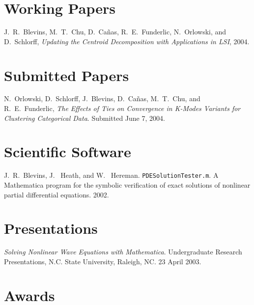 \documentclass[overlapped,line,final,11pt,letterpaper]{res}
\begin{document}
\begin{resume}

\section{\bf Working Papers}

J.\ R.\ Blevins, M.\ T.\ Chu, D.\ Ca\~{n}as, R.\ E.\ Funderlic, N.\
Orlowski, and D.\ Schlorff, {\em Updating the Centroid Decomposition
  with Applications in LSI}, 2004.


\newpage

\section{\bf Submitted Papers}

N.\ Orlowski, D.\ Schlorff, J.\ Blevins, D.\ Ca\~{n}as, M.\ T.\
Chu, and R.\ E.\ Funderlic, {\em The Effects of Ties on Convergence in
  K-Modes Variants for Clustering Categorical Data}. Submitted June 7,
2004.


\section{\bf Scientific Software}

J.\ R.\ Blevins, J. \ Heath, and W. \
Hereman. \texttt{PDESolutionTester.m}.  A Mathematica program for the
symbolic verification of exact solutions of nonlinear partial
differential equations. 2002.


\section{\bf Presentations}

{\em Solving Nonlinear Wave Equations with Mathematica}. Undergraduate
Research Presentations, N.C. State University, Raleigh,
NC. 23 April 2003.



\section{\bf Awards}


\end{resume}
\end{document}
